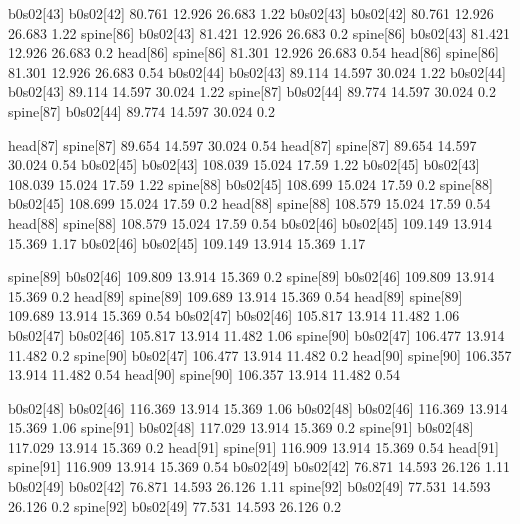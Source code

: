 b0s02[43]    b0s02[42]    80.761    12.926    26.683    1.22
b0s02[43]    b0s02[42]    80.761    12.926    26.683    1.22
spine[86]    b0s02[43]    81.421    12.926    26.683    0.2
spine[86]    b0s02[43]    81.421    12.926    26.683    0.2
head[86]    spine[86]    81.301    12.926    26.683    0.54
head[86]    spine[86]    81.301    12.926    26.683    0.54
b0s02[44]    b0s02[43]    89.114    14.597    30.024    1.22
b0s02[44]    b0s02[43]    89.114    14.597    30.024    1.22
spine[87]    b0s02[44]    89.774    14.597    30.024    0.2
spine[87]    b0s02[44]    89.774    14.597    30.024    0.2


head[87]    spine[87]    89.654    14.597    30.024    0.54
head[87]    spine[87]    89.654    14.597    30.024    0.54
b0s02[45]    b0s02[43]    108.039    15.024    17.59    1.22
b0s02[45]    b0s02[43]    108.039    15.024    17.59    1.22
spine[88]    b0s02[45]    108.699    15.024    17.59    0.2
spine[88]    b0s02[45]    108.699    15.024    17.59    0.2
head[88]    spine[88]    108.579    15.024    17.59    0.54
head[88]    spine[88]    108.579    15.024    17.59    0.54
b0s02[46]    b0s02[45]    109.149    13.914    15.369    1.17
b0s02[46]    b0s02[45]    109.149    13.914    15.369    1.17


spine[89]    b0s02[46]    109.809    13.914    15.369    0.2
spine[89]    b0s02[46]    109.809    13.914    15.369    0.2
head[89]    spine[89]    109.689    13.914    15.369    0.54
head[89]    spine[89]    109.689    13.914    15.369    0.54
b0s02[47]    b0s02[46]    105.817    13.914    11.482    1.06
b0s02[47]    b0s02[46]    105.817    13.914    11.482    1.06
spine[90]    b0s02[47]    106.477    13.914    11.482    0.2
spine[90]    b0s02[47]    106.477    13.914    11.482    0.2
head[90]    spine[90]    106.357    13.914    11.482    0.54
head[90]    spine[90]    106.357    13.914    11.482    0.54


b0s02[48]    b0s02[46]    116.369    13.914    15.369    1.06
b0s02[48]    b0s02[46]    116.369    13.914    15.369    1.06
spine[91]    b0s02[48]    117.029    13.914    15.369    0.2
spine[91]    b0s02[48]    117.029    13.914    15.369    0.2
head[91]    spine[91]    116.909    13.914    15.369    0.54
head[91]    spine[91]    116.909    13.914    15.369    0.54
b0s02[49]    b0s02[42]    76.871    14.593    26.126    1.11
b0s02[49]    b0s02[42]    76.871    14.593    26.126    1.11
spine[92]    b0s02[49]    77.531    14.593    26.126    0.2
spine[92]    b0s02[49]    77.531    14.593    26.126    0.2


